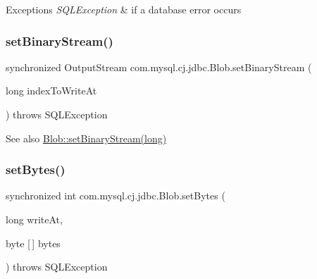 \begin{DoxyExceptions}{Exceptions}
{\em S\+Q\+L\+Exception} & if a database error occurs \\
\hline
\end{DoxyExceptions}
\mbox{\label{classcom_1_1mysql_1_1cj_1_1jdbc_1_1_blob_abbef32522fa0951a0e417442c36ff0b1}} 
\subsubsection{\texorpdfstring{set\+Binary\+Stream()}{setBinaryStream()}}
{\footnotesize\ttfamily synchronized Output\+Stream com.\+mysql.\+cj.\+jdbc.\+Blob.\+set\+Binary\+Stream (\begin{DoxyParamCaption}\item[{long}]{index\+To\+Write\+At }\end{DoxyParamCaption}) throws S\+Q\+L\+Exception}

\begin{DoxySeeAlso}{See also}
\mbox{\hyperlink{classcom_1_1mysql_1_1cj_1_1jdbc_1_1_blob_abbef32522fa0951a0e417442c36ff0b1}{Blob\+::set\+Binary\+Stream(long)}} 
\end{DoxySeeAlso}
\mbox{\label{classcom_1_1mysql_1_1cj_1_1jdbc_1_1_blob_a34f9a18a23ec153717f7b191dae58ab4}} 
\subsubsection{\texorpdfstring{set\+Bytes()}{setBytes()}\hspace{0.1cm}{\footnotesize\ttfamily [1/2]}}
{\footnotesize\ttfamily synchronized int com.\+mysql.\+cj.\+jdbc.\+Blob.\+set\+Bytes (\begin{DoxyParamCaption}\item[{long}]{write\+At,  }\item[{byte \mbox{[}$\,$\mbox{]}}]{bytes }\end{DoxyParamCaption}) throws S\+Q\+L\+Exception}

